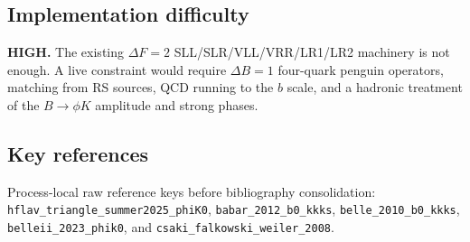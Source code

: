 \subsection*{Implementation difficulty}
\textbf{HIGH.}  The existing \(\Delta F=2\) SLL/SLR/VLL/VRR/LR1/LR2 machinery is not
enough.  A live constraint would require \(\Delta B=1\) four-quark penguin
operators, matching from RS sources, QCD running to the \(b\) scale, and a
hadronic treatment of the \(B\to\phi K\) amplitude and strong phases.

\subsection*{Key references}
Process-local raw reference keys before bibliography consolidation:
\texttt{hflav\_triangle\_summer2025\_phiK0},
\texttt{babar\_2012\_b0\_kkks},
\texttt{belle\_2010\_b0\_kkks},
\texttt{belleii\_2023\_phik0}, and
\texttt{csaki\_falkowski\_weiler\_2008}.
